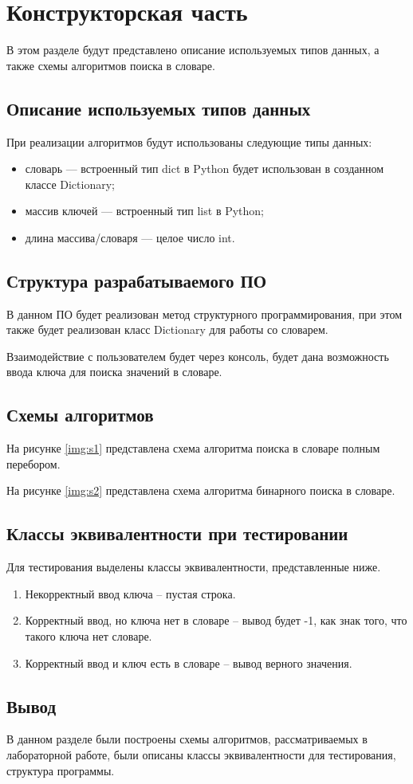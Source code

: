 \chapter{Конструкторская часть}
В этом разделе будут представлено описание используемых типов данных,
а также схемы алгоритмов поиска в словаре.

\section{Описание используемых типов данных}
При реализации алгоритмов будут использованы следующие типы данных:
\begin{itemize}[label = ---]
	\item словарь --- встроенный тип dict \cite{pythondict} в Python\cite{pythonlang} будет использован в созданном классе Dictionary;
	\item массив ключей --- встроенный тип list \cite{pythonlist} в Python\cite{pythonlang};
	\item длина массива/словаря --- целое число int.
\end{itemize}

\section{Структура разрабатываемого ПО}
В данном ПО будет реализован метод структурного программирования, при этом также будет реализован класс Dictionary для работы со словарем.

Взаимодействие с пользователем будет через консоль, будет дана возможность ввода ключа для поиска значений в словаре.

\section{Схемы алгоритмов}
На рисунке \ref{img:s1} представлена схема алгоритма поиска в словаре полным перебором.

\clearpage

На рисунке \ref{img:s2} представлена схема алгоритма бинарного поиска в словаре.

\clearpage

\section{Классы эквивалентности при тестировании}
Для тестирования выделены классы эквивалентности, представленные ниже.
\begin{enumerate}
	\item Некорректный ввод ключа -- пустая строка.
	\item Корректный ввод, но ключа нет в словаре -- вывод будет -1, как знак того, что такого ключа нет словаре.
	\item Корректный ввод и ключ есть в словаре -- вывод верного значения.
\end{enumerate}

\section{Вывод}
В данном разделе были построены схемы алгоритмов, рассматриваемых в лабораторной работе, были описаны классы эквивалентности для тестирования, структура программы.